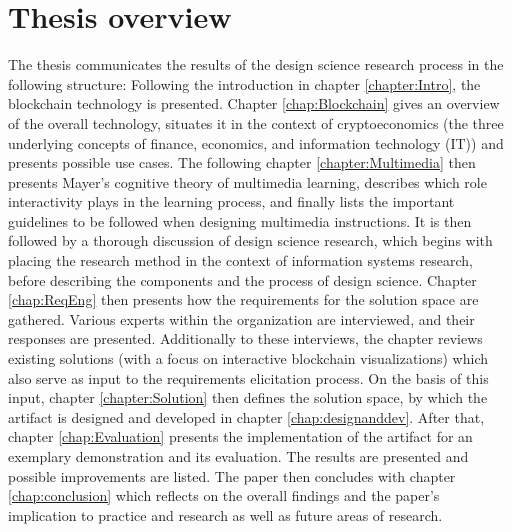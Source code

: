 \section{Thesis overview} \label{sec:ThesisOverview}
The thesis communicates the results of the design science research process in the following structure: Following the introduction in chapter \ref{chapter:Intro}, the blockchain technology is presented. Chapter \ref{chap:Blockchain} gives an overview of the overall technology, situates it in the context of cryptoeconomics (the three underlying concepts of finance, economics, and information technology (IT)) and presents possible use cases. The following chapter \ref{chapter:Multimedia} then presents Mayer's cognitive theory of multimedia learning, describes which role interactivity plays in the learning process, and finally lists the important guidelines to be followed when designing multimedia instructions. It is then followed by a thorough discussion of design science research, which begins with placing the research method in the context of information systems research, before describing the components and the process of design science. Chapter \ref{chap:ReqEng} then presents how the requirements for the solution space are gathered. Various experts within the organization are interviewed, and their responses are presented. Additionally to these interviews, the chapter reviews existing solutions (with a focus on interactive blockchain visualizations) which also serve as input to the requirements elicitation process. On the basis of this input, chapter \ref{chapter:Solution} then defines the solution space, by which the artifact is designed and developed in chapter \ref{chap:designanddev}. After that, chapter \ref{chap:Evaluation} presents the implementation of the artifact for an exemplary demonstration and its evaluation. The results are presented and possible improvements are listed. The paper then concludes with chapter \ref{chap:conclusion} which reflects on the overall findings and the paper's implication to practice and research as well as future areas of research.

